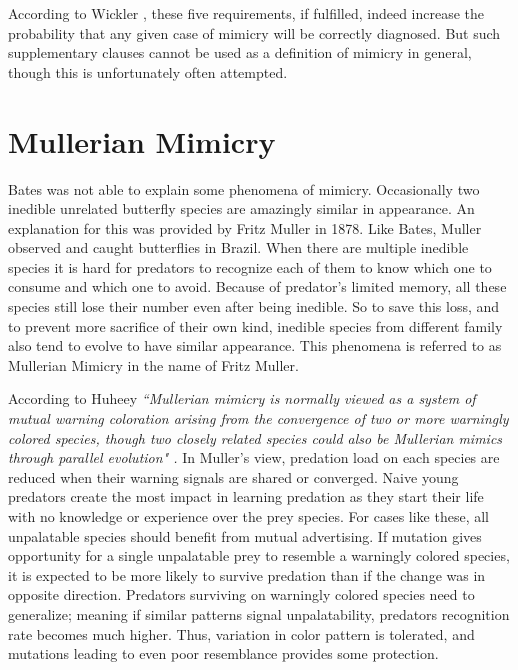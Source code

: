 According to Wickler \cite{wickler1986}, these five requirements, if fulfilled, indeed increase the probability that any given case of mimicry will be correctly diagnosed. But such supplementary clauses cannot be used as a definition of mimicry in general, though this is unfortunately often attempted. 

\section{Mullerian Mimicry}
Bates was not able to explain some phenomena of mimicry. Occasionally two inedible unrelated butterfly species are amazingly similar in appearance. An explanation for this was provided by Fritz Muller in 1878. Like Bates, Muller observed and caught butterflies in Brazil. When there are multiple inedible species it is hard for predators to recognize each of them to know which one to consume and which one to avoid. Because of predator's limited memory, all these species still lose their number even after being inedible. So to save this loss, and to prevent more sacrifice of their own kind, inedible species from different family also tend to evolve to have similar appearance. This phenomena is referred to as Mullerian Mimicry in the name of Fritz Muller.

According to Huheey \cite{huheey1988} \textsl{``Mullerian mimicry is normally viewed as a system of mutual warning coloration arising from the convergence of two or more warningly colored species, though two closely related species could also be Mullerian mimics through parallel evolution" \cite{muller1879}.} In Muller's view, predation load on each species are reduced when their warning signals are shared or converged. Naive young predators create the most impact in learning predation as they start their life with no knowledge or experience over the prey species. For cases like these, all unpalatable species should benefit from mutual advertising. If mutation gives opportunity for a single unpalatable prey to resemble a warningly colored species, it is expected to be more likely to survive predation than if the change was in opposite direction. Predators surviving on warningly colored species need to generalize; meaning if similar patterns signal unpalatability, predators recognition rate becomes much higher. Thus, variation in color pattern is tolerated, and mutations leading to even poor resemblance provides some protection. 

